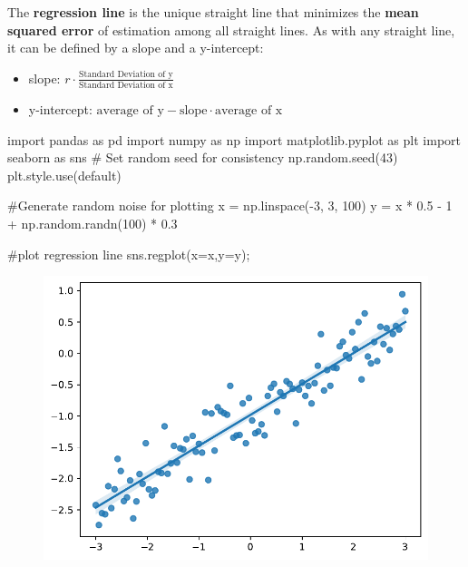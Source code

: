 \documentclass[
  letterpaper,
  DIV=11,
  numbers=noendperiod]{scrreprt}
\newenvironment{Shaded}{\begin{snugshade}}{\end{snugshade}}
\newcommand{\CommentTok}[1]{\textcolor[rgb]{0.37,0.37,0.37}{#1}}
\newcommand{\DecValTok}[1]{\textcolor[rgb]{0.68,0.00,0.00}{#1}}
\newcommand{\FloatTok}[1]{\textcolor[rgb]{0.68,0.00,0.00}{#1}}
\newcommand{\ImportTok}[1]{\textcolor[rgb]{0.00,0.46,0.62}{#1}}
\newcommand{\NormalTok}[1]{\textcolor[rgb]{0.00,0.23,0.31}{#1}}
\newcommand{\OperatorTok}[1]{\textcolor[rgb]{0.37,0.37,0.37}{#1}}
\newcommand{\StringTok}[1]{\textcolor[rgb]{0.13,0.47,0.30}{#1}}
\providecommand{\tightlist}{%
  \setlength{\itemsep}{0pt}\setlength{\parskip}{0pt}}\usepackage{longtable,booktabs,array}
\begin{document}
The \textbf{regression line} is the unique straight line that minimizes
the \textbf{mean squared error} of estimation among all straight lines.
As with any straight line, it can be defined by a slope and a
y-intercept:

\begin{itemize}
\tightlist
\item
  slope:
  \(r \cdot \frac{\text{Standard Deviation of y}}{\text{Standard Deviation of x}}\)
\item
  y-intercept:
  \(\text{average of y} - \text{slope}\cdot\text{average of x}\)
\end{itemize}

\begin{Shaded}
\begin{Highlighting}[]
\ImportTok{import}\NormalTok{ pandas }\ImportTok{as}\NormalTok{ pd}
\ImportTok{import}\NormalTok{ numpy }\ImportTok{as}\NormalTok{ np}
\ImportTok{import}\NormalTok{ matplotlib.pyplot }\ImportTok{as}\NormalTok{ plt}
\ImportTok{import}\NormalTok{ seaborn }\ImportTok{as}\NormalTok{ sns}
\CommentTok{\# Set random seed for consistency }
\NormalTok{np.random.seed(}\DecValTok{43}\NormalTok{)}
\NormalTok{plt.style.use(}\StringTok{\textquotesingle{}default\textquotesingle{}}\NormalTok{) }

\CommentTok{\#Generate random noise for plotting}
\NormalTok{x }\OperatorTok{=}\NormalTok{ np.linspace(}\OperatorTok{{-}}\DecValTok{3}\NormalTok{, }\DecValTok{3}\NormalTok{, }\DecValTok{100}\NormalTok{)}
\NormalTok{y }\OperatorTok{=}\NormalTok{ x }\OperatorTok{*} \FloatTok{0.5} \OperatorTok{{-}} \DecValTok{1} \OperatorTok{+}\NormalTok{ np.random.randn(}\DecValTok{100}\NormalTok{) }\OperatorTok{*} \FloatTok{0.3}

\CommentTok{\#plot regression line}
\NormalTok{sns.regplot(x}\OperatorTok{=}\NormalTok{x,y}\OperatorTok{=}\NormalTok{y)}\OperatorTok{;}
\end{Highlighting}
\end{Shaded}

\begin{figure}[H]

{\centering \includegraphics{intro_to_modeling/intro_to_modeling_files/figure-pdf/cell-2-output-1.pdf}

}

\end{figure}
\end{document}
